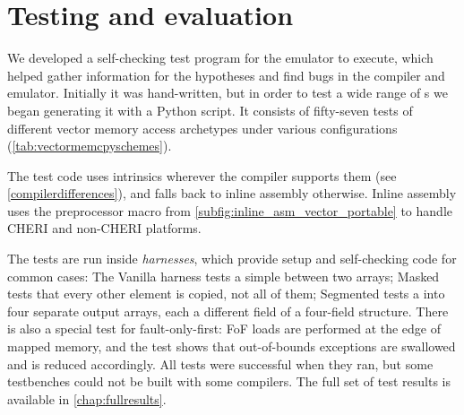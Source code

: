 \section{Testing and evaluation}\label{chap:software:sec:hypotheses}\label{chap:software:eval}
We developed a self-checking test program for the emulator to execute, which helped gather information for the hypotheses and find bugs in the compiler and emulator.
Initially it was hand-written, but in order to test a wide range of s we began generating it with a Python script.
It consists of fifty-seven tests of different vector memory access archetypes under various configurations (\cref{tab:vectormemcpyschemes}).

The test code uses intrinsics wherever the compiler supports them (see \cref{compilerdifferences}), and falls back to inline assembly otherwise.
Inline assembly uses the preprocessor macro from \cref{subfig:inline_asm_vector_portable} to handle CHERI and non-CHERI platforms.

The tests are run inside \emph{harnesses}, which provide setup and self-checking code for common cases:
The Vanilla harness tests a simple  between two arrays;
Masked tests that every other element is copied, not all of them;
Segmented tests a  into four separate output arrays, each a different field of a four-field structure.
There is also a special test for fault-only-first: FoF loads are performed at the edge of mapped memory, and the test shows that out-of-bounds exceptions are swallowed and  is reduced accordingly.
All tests were successful when they ran, but some testbenches could not be built with some compilers.
The full set of test results is available in \cref{chap:fullresults}.

